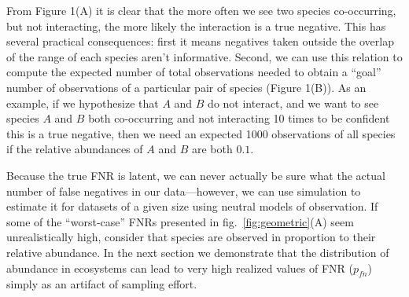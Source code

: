 \documentclass[11pt]{article}
\begin{document}
From Figure 1(A) it is clear that the more often we see two species
co-occurring, but not interacting, the more likely the interaction is a
true negative. This has several practical consequences: first it means
negatives taken outside the overlap of the range of each species aren't
informative. Second, we can use this relation to compute the expected
number of total observations needed to obtain a ``goal'' number of
observations of a particular pair of species (Figure 1(B)). As an
example, if we hypothesize that \(A\) and \(B\) do not interact, and we
want to see species \(A\) and \(B\) both co-occurring and not
interacting 10 times to be confident this is a true negative, then we
need an expected 1000 observations of all species if the relative
abundances of \(A\) and \(B\) are both \(0.1\).

Because the true FNR is latent, we can never actually be sure what the
actual number of false negatives in our data---however, we can use
simulation to estimate it for datasets of a given size using neutral
models of observation. If some of the ``worst-case'' FNRs presented in
fig.~\ref{fig:geometric}(A) seem unrealistically high, consider that
species are observed in proportion to their relative abundance. In the
next section we demonstrate that the distribution of abundance in
ecosystems can lead to very high realized values of FNR (\(p_{fn}\))
simply as an artifact of sampling effort.
\end{document}

